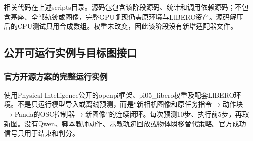 相关代码在上述scripts目录。源码包包含该阶段源码、统计和调用依赖源码；不包含基座、全部轨迹或图像，完整GPU复现仍需原环境与LIBERO资产。源码解压后的CPU测试只用合成数组。权重未改变，因此该阶段没有新增适配器文件。


\subsection{公开可运行实例与目标图接口}\label{s14-detail-12}

\subsubsection{官方开源方案的完整运行实例}\label{s14-detail-13}

使用Physical Intelligence公开的openpi框架、pi05\_libero权重及配套LIBERO环境。不是只运行模型导入或离线预测，而是``新相机图像和原任务指令\(\rightarrow\)动作块\(\rightarrow\)Panda的OSC控制器\(\rightarrow\)新图像''的连续闭环。每次预测10步、执行前5步，再取新图。没有Qwen、脚本教师动作、示教轨迹回放或物体瞬移替代策略。官方成功信号只用于结束和判分。

